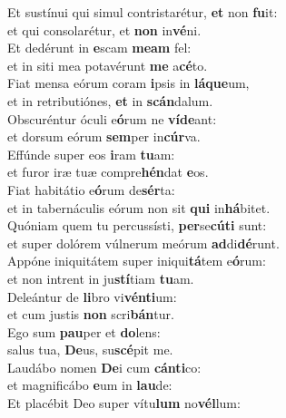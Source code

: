 \oddverse Et sustínui qui simul contristarétur, \textbf{et} non \textbf{fu}it:~\*\\
\oddverse et qui consolarétur, et \textbf{non} in\textbf{vé}ni.\\
\evenverse Et dedérunt in \textbf{e}scam \textbf{me}\textbf{am} fel:~\*\\
\evenverse et in siti mea potavérunt \textbf{me} a\textbf{cé}to.\\
\oddverse Fiat mensa eórum coram \textbf{i}psis in \textbf{lá}\textbf{que}um,~\*\\
\oddverse et in retributiónes, \textbf{et} in \textbf{scán}dalum.\\
\evenverse Obscuréntur óculi e\textbf{ó}rum ne \textbf{ví}\textbf{de}ant:~\*\\
\evenverse et dorsum eórum \textbf{sem}per in\textbf{cúr}va.\\
\oddverse Effúnde super eos \textbf{i}ram \textbf{tu}am:~\*\\
\oddverse et furor iræ tuæ compre\textbf{hén}dat \textbf{e}os.\\
\evenverse Fiat habitátio e\textbf{ó}rum de\textbf{sér}ta:~\*\\
\evenverse et in tabernáculis eórum non sit \textbf{qui} in\textbf{há}bitet.\\
\oddverse Quóniam quem tu percussísti, \textbf{per}se\textbf{cú}\textbf{ti} sunt:~\*\\
\oddverse et super dolórem vúlnerum meórum \textbf{ad}di\textbf{dé}runt.\\
\evenverse Appóne iniquitátem super iniqui\textbf{tá}tem e\textbf{ó}rum:~\*\\
\evenverse et non intrent in ju\textbf{stí}tiam \textbf{tu}am.\\
\oddverse Deleántur de \textbf{li}bro vi\textbf{vén}\textbf{ti}um:~\*\\
\oddverse et cum justis \textbf{non} scri\textbf{bán}tur.\\
\evenverse Ego sum \textbf{pau}per et \textbf{do}lens:~\*\\
\evenverse salus tua, \textbf{De}us, su\textbf{scé}pit me.\\
\oddverse Laudábo nomen \textbf{De}i cum \textbf{cán}\textbf{ti}co:~\*\\
\oddverse et magnificábo \textbf{e}um in \textbf{lau}de:\\
\evenverse Et placébit Deo super vítu\textbf{lum} no\textbf{vél}lum:~\*\\
